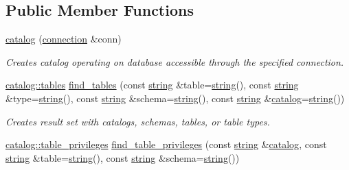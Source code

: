 \subsection*{Public Member Functions}
\begin{DoxyCompactItemize}
\item 
\mbox{\hyperlink{classnanodbc_1_1catalog_ad18e6a0858639c14eb33b90736ab6d0e}{catalog}} (\mbox{\hyperlink{classnanodbc_1_1connection}{connection}} \&conn)
\begin{DoxyCompactList}\small\item\em Creates catalog operating on database accessible through the specified connection. \end{DoxyCompactList}\item 
\mbox{\hyperlink{classnanodbc_1_1catalog_1_1tables}{catalog\+::tables}} \mbox{\hyperlink{classnanodbc_1_1catalog_a8271eae78585043dfb59c85cc2e361f5}{find\+\_\+tables}} (const \mbox{\hyperlink{namespacenanodbc_abfc0ece56278e590911ec8352774c212}{string}} \&table=\mbox{\hyperlink{namespacenanodbc_abfc0ece56278e590911ec8352774c212}{string}}(), const \mbox{\hyperlink{namespacenanodbc_abfc0ece56278e590911ec8352774c212}{string}} \&type=\mbox{\hyperlink{namespacenanodbc_abfc0ece56278e590911ec8352774c212}{string}}(), const \mbox{\hyperlink{namespacenanodbc_abfc0ece56278e590911ec8352774c212}{string}} \&schema=\mbox{\hyperlink{namespacenanodbc_abfc0ece56278e590911ec8352774c212}{string}}(), const \mbox{\hyperlink{namespacenanodbc_abfc0ece56278e590911ec8352774c212}{string}} \&\mbox{\hyperlink{classnanodbc_1_1catalog}{catalog}}=\mbox{\hyperlink{namespacenanodbc_abfc0ece56278e590911ec8352774c212}{string}}())
\begin{DoxyCompactList}\small\item\em Creates result set with catalogs, schemas, tables, or table types. \end{DoxyCompactList}\item 
\mbox{\hyperlink{classnanodbc_1_1catalog_1_1table__privileges}{catalog\+::table\+\_\+privileges}} \mbox{\hyperlink{classnanodbc_1_1catalog_a4fdba40e8bf0101d68484dd12ac520db}{find\+\_\+table\+\_\+privileges}} (const \mbox{\hyperlink{namespacenanodbc_abfc0ece56278e590911ec8352774c212}{string}} \&\mbox{\hyperlink{classnanodbc_1_1catalog}{catalog}}, const \mbox{\hyperlink{namespacenanodbc_abfc0ece56278e590911ec8352774c212}{string}} \&table=\mbox{\hyperlink{namespacenanodbc_abfc0ece56278e590911ec8352774c212}{string}}(), const \mbox{\hyperlink{namespacenanodbc_abfc0ece56278e590911ec8352774c212}{string}} \&schema=\mbox{\hyperlink{namespacenanodbc_abfc0ece56278e590911ec8352774c212}{string}}())

\end{DoxyCompactItemize}
